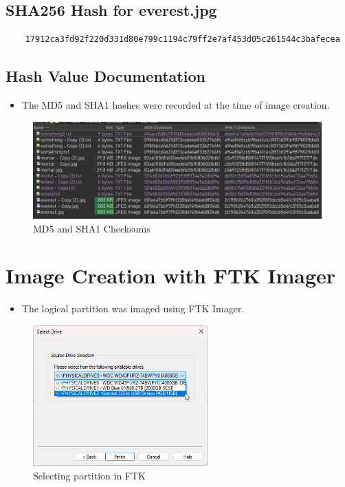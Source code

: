 \documentclass[11pt]{article}
\begin{document}
\subsection{SHA256 Hash for everest.jpg}
\begin{verbatim}
    17912ca3fd92f220d331d80e799c1194c79ff2e7af453d05c261544c3bafecea
\end{verbatim}

\subsection{Hash Value Documentation}
\begin{itemize}
    \item The MD5 and SHA1 hashes were recorded at the time of image creation.
\end{itemize}
\begin{figure}[H]
    \centering
    \includegraphics[width=0.99\textwidth]{checksums.jpg}
    \caption{MD5 and SHA1 Checksums}
    \label{fig:1}
\end{figure}

\section{Image Creation with FTK Imager}
\begin{itemize}
    \item The logical partition was imaged using FTK Imager.
\end{itemize}
\begin{figure}[H]
    \centering
    \includegraphics[width=0.6\textwidth]{imaging_4.png}
    \caption{Selecting partition in FTK}
    \label{fig:1}
\end{figure}
\end{document}
